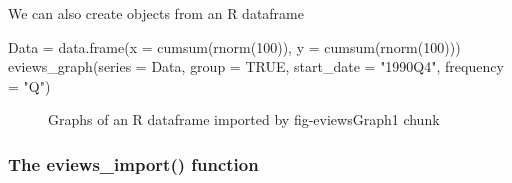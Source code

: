\documentclass[
  letterpaper,
  DIV=11,
  numbers=noendperiod]{scrartcl}
\newenvironment{Shaded}{\begin{snugshade}}{\end{snugshade}}
\newcommand{\AttributeTok}[1]{\textcolor[rgb]{0.40,0.45,0.13}{#1}}
\newcommand{\ConstantTok}[1]{\textcolor[rgb]{0.56,0.35,0.01}{#1}}
\newcommand{\DecValTok}[1]{\textcolor[rgb]{0.68,0.00,0.00}{#1}}
\newcommand{\FunctionTok}[1]{\textcolor[rgb]{0.28,0.35,0.67}{#1}}
\newcommand{\NormalTok}[1]{\textcolor[rgb]{0.00,0.23,0.31}{#1}}
\newcommand{\OtherTok}[1]{\textcolor[rgb]{0.00,0.23,0.31}{#1}}
\newcommand{\StringTok}[1]{\textcolor[rgb]{0.13,0.47,0.30}{#1}}
\begin{document}
We can also create objects from an R dataframe

\begin{Shaded}
\begin{Highlighting}[]
\NormalTok{Data }\OtherTok{=} \FunctionTok{data.frame}\NormalTok{(}\AttributeTok{x =} \FunctionTok{cumsum}\NormalTok{(}\FunctionTok{rnorm}\NormalTok{(}\DecValTok{100}\NormalTok{)), }\AttributeTok{y =} \FunctionTok{cumsum}\NormalTok{(}\FunctionTok{rnorm}\NormalTok{(}\DecValTok{100}\NormalTok{)))}
\FunctionTok{eviews\_graph}\NormalTok{(}\AttributeTok{series =}\NormalTok{ Data, }\AttributeTok{group =} \ConstantTok{TRUE}\NormalTok{, }\AttributeTok{start\_date =} \StringTok{"1990Q4"}\NormalTok{,}
    \AttributeTok{frequency =} \StringTok{"Q"}\NormalTok{)}
\end{Highlighting}
\end{Shaded}

\begin{figure}

\begin{minipage}[t]{0.50\linewidth}

{\centering 


\caption{\label{fig-eviewsGraph1}Graphs of an R dataframe imported by
fig-eviewsGraph1 chunk}

}

\end{minipage}%

\end{figure}

\hypertarget{the-eviews_import-function}{%
\subsubsection{The eviews\_import()
function}\label{the-eviews_import-function}}
\end{document}
